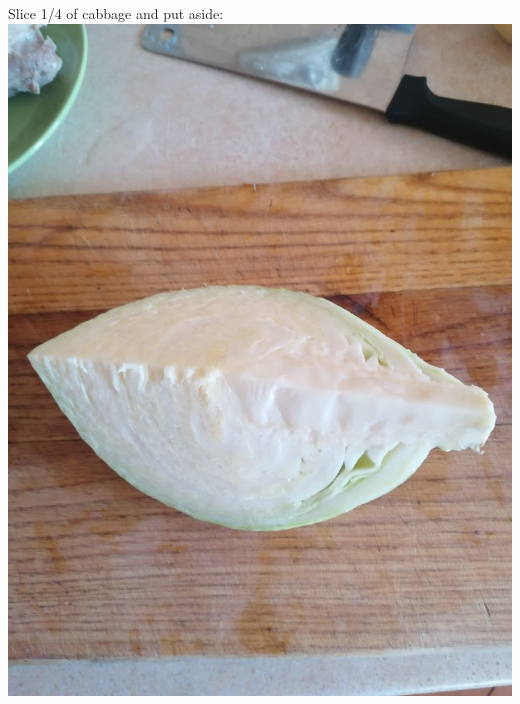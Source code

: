 \documentclass[11pt,a4paper]{article}
\begin{document}
Slice 1/4 of cabbage and put aside: \\
\includegraphics[width=\textwidth]{5.jpg}
\end{document}
